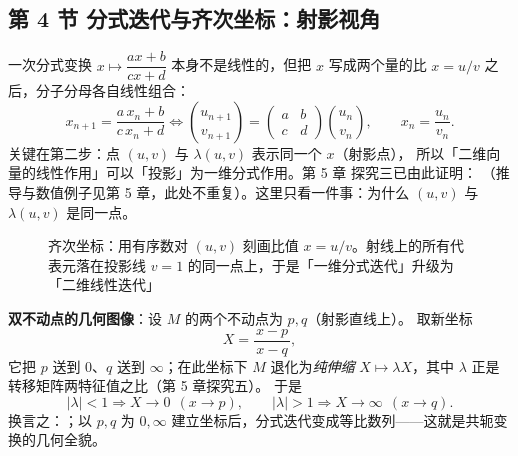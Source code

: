 \subsection{第 4 节 分式迭代与齐次坐标：射影视角}

一次分式变换 $x\mapsto\dfrac{ax+b}{cx+d}$ 本身不是线性的，但把 $x$
写成两个量的比 $x=u/v$ 之后，分子分母各自线性组合：
\[
  x_{n+1}=\frac{a\,x_n+b}{c\,x_n+d}
  \iff
  \binom{u_{n+1}}{v_{n+1}}
  =\begin{pmatrix}a&b\\ c&d\end{pmatrix}\binom{u_n}{v_n},
  \qquad x_n=\frac{u_n}{v_n}.
\]
关键在第二步：点 $(u,v)$ 与 $\lambda(u,v)$ 表示同一个 $x$（射影点），
所以「二维向量的线性作用」可以「投影」为一维分式作用。第 5 章
探究三已由此证明：
（推导与数值例子见第 5 章，此处不重复）。这里只看一件事：为什么
$(u,v)$ 与 $\lambda(u,v)$ 是同一点。

\begin{figure}[htbp]
  \centering
  \caption{齐次坐标：用有序数对 $(u,v)$ 刻画比值 $x=u/v$。射线上的所有代表元落在投影线 $v=1$ 的同一点上，于是「一维分式迭代」升级为「二维线性迭代」}
  \label{fig:ray-projective}
\end{figure}

\textbf{双不动点的几何图像}：设 $M$ 的两个不动点为 $p,q$（射影直线上）。
取新坐标
\[
  X=\frac{x-p}{\,x-q\,},
\]
它把 $p$ 送到 $0$、$q$ 送到 $\infty$；在此坐标下 $M$ 退化为\emph{纯伸缩}
$X\mapsto\lambda X$，其中 $\lambda$ 正是转移矩阵两特征值之比（第 5 章探究五）。
于是
\[
  |\lambda|<1\Rightarrow X\to0\ \ (x\to p),\qquad
  |\lambda|>1\Rightarrow X\to\infty\ \ (x\to q).
\]
换言之：；以 $p,q$ 为
$0,\infty$ 建立坐标后，分式迭代变成等比数列——这就是共轭变换的几何全貌。

